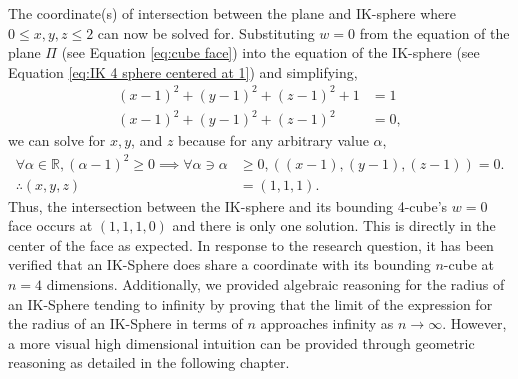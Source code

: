 The coordinate(s) of intersection between the plane and IK-sphere where $0\leq x, y, z \leq 2$ can now be solved for. Substituting $w=0$ from the equation of the plane $\Pi$ (see Equation \ref{eq:cube face}) into the equation of the IK-sphere (see Equation \ref{eq:IK 4 sphere centered at 1}) and simplifying, 
\begin{align*}
    (x-1)^2+(y-1)^2+(z-1)^2+1&=1\\
    (x-1)^2+(y-1)^2+(z-1)^2&=0,
\end{align*}
we can solve for $x, y$, and $z$ because for any arbitrary value $\alpha$,
\begin{align*}
    \forall  \alpha \in \mathbb{R}, (\alpha-1)^2 \geq 0 \implies \forall \alpha \ni \alpha &\geq 0, \left( (x-1), (y-1), (z-1)\right) = 0.\\
    \therefore (x, y, z)&=(1, 1, 1).
\end{align*}
Thus, the intersection between the IK-sphere and its bounding 4-cube's $w=0$ face occurs at $(1,1,1,0)$ and there is only one solution. This is directly in the center of the face as expected. In response to the research question, it has been verified that an IK-Sphere does share a coordinate with its bounding $n$-cube at $n=4$ dimensions. Additionally, we provided algebraic reasoning for the radius of an IK-Sphere tending to infinity by proving that the limit of the expression for the radius of an IK-Sphere in terms of $n$ approaches infinity as $n \to \infty$. However, a more visual high dimensional intuition can be provided through geometric reasoning as detailed in the following chapter.

    
